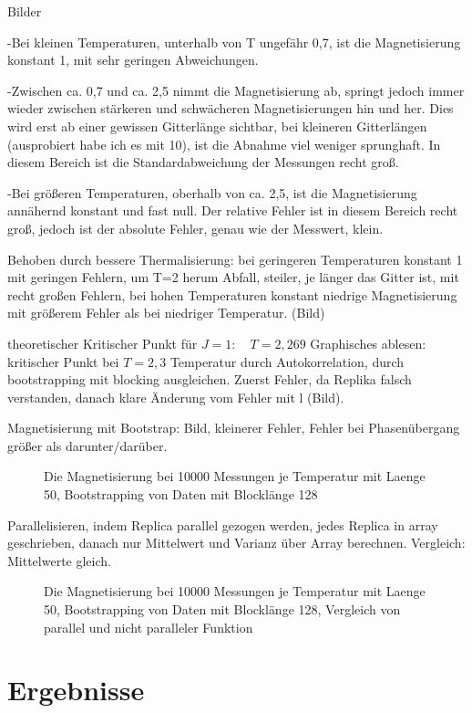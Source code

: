 \documentclass{scrreprt}
\begin{document}
	Bilder
	
	-Bei kleinen Temperaturen, unterhalb von T ungefähr 0,7, ist die
	 Magnetisierung konstant 1, mit sehr geringen Abweichungen.
	 
	 -Zwischen ca. 0,7 und ca. 2,5 nimmt die Magnetisierung ab, springt jedoch
	 immer wieder zwischen stärkeren und schwächeren Magnetisierungen hin und
	 her. Dies wird erst ab einer gewissen Gitterlänge sichtbar, bei kleineren
	 Gitterlängen (ausprobiert habe ich es mit 10), ist die Abnahme viel weniger
	 sprunghaft. In diesem Bereich ist die Standardabweichung der Messungen recht
	 groß.
	 
	 -Bei größeren Temperaturen, oberhalb von ca. 2,5, ist die Magnetisierung
	 annähernd konstant und fast null. Der relative Fehler ist in diesem Bereich
	 recht groß, jedoch ist der absolute Fehler, genau wie der Messwert, klein.
	 
	 Behoben durch bessere Thermalisierung: bei geringeren Temperaturen konstant 1 mit geringen Fehlern, 
	 um T=2 herum Abfall, steiler, je länger das Gitter ist, mit recht großen Fehlern, bei hohen Temperaturen konstant niedrige Magnetisierung mit größerem Fehler als bei niedriger Temperatur. (Bild)
	 
	 theoretischer Kritischer Punkt für $J=1:\quad T=2,269$
	 Graphisches ablesen: kritischer Punkt bei $T=2,3$
	 Temperatur durch Autokorrelation, durch bootstrapping mit blocking ausgleichen. 
	 Zuerst Fehler, da Replika falsch verstanden, danach klare Änderung vom Fehler mit l (Bild).
	 
	 Magnetisierung mit Bootstrap: Bild, kleinerer Fehler, Fehler bei Phasenübergang größer als darunter/darüber.
	\begin{figure}
		
		\label{fig:magnetisierungbootstrap-l-128}
		\caption{Die Magnetisierung bei 10000 Messungen je Temperatur mit Laenge 50, Bootstrapping von Daten mit Blocklänge 128}
	\end{figure}
		
	Parallelisieren, indem Replica parallel gezogen werden, jedes Replica in array geschrieben, danach nur Mittelwert und Varianz über Array berechnen.
	Vergleich: Mittelwerte gleich.
	\begin{figure}
		
		\label{fig:bootstrapparallel-l-128}
		\caption{Die Magnetisierung bei 10000 Messungen je Temperatur mit Laenge 50, Bootstrapping von Daten mit Blocklänge 128, Vergleich von parallel und nicht paralleler Funktion}
	\end{figure}	
	
		
	\chapter{Ergebnisse}
	\listoffigures
	\listoftables
	
	
	
	\printbibliography[heading=bibintoc]
\end{document}

